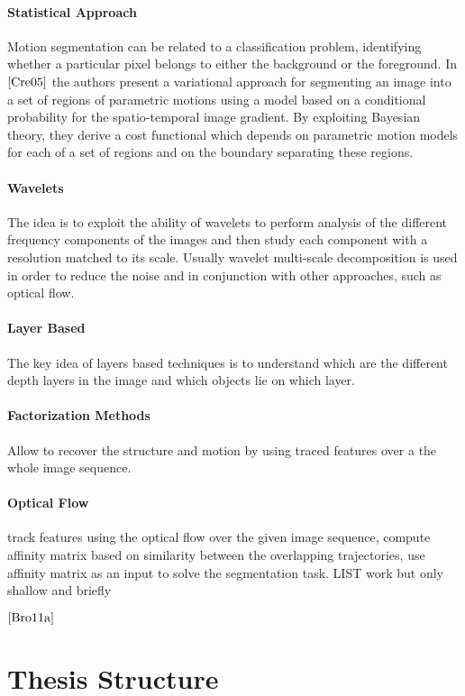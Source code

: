 \paragraph{Statistical Approach} Motion segmentation can be related to a classification problem, identifying whether a particular pixel belongs to either the background or the foreground. In $\cite{Cre05}$ the authors present a variational approach for segmenting an image into a set of regions of parametric motions using a model based on a conditional probability for the spatio-temporal image gradient. By exploiting Bayesian theory, they derive a cost functional which depends on parametric motion models for each  of a set of regions and on the boundary separating these regions.

\paragraph{Wavelets}
The idea is to exploit the ability of wavelets to perform analysis of the different frequency components of the images and then study each component with a resolution matched to its scale. Usually wavelet multi-scale decomposition is used in order to reduce the noise and in conjunction with other approaches, such as optical flow.

\paragraph{Layer Based} The key idea of layers based techniques is to understand which are the different depth layers in the image and which objects lie on which layer. 

\paragraph{Factorization Methods} Allow to recover the structure and motion by using traced features over a the whole image sequence.

\paragraph{Optical Flow}
track features using the optical flow over the given image sequence, compute affinity matrix based on similarity between the overlapping trajectories, use affinity matrix as an input to solve the segmentation task. LIST work but only shallow and briefly

$\cite{Bro11a}$

\section{Thesis Structure}


